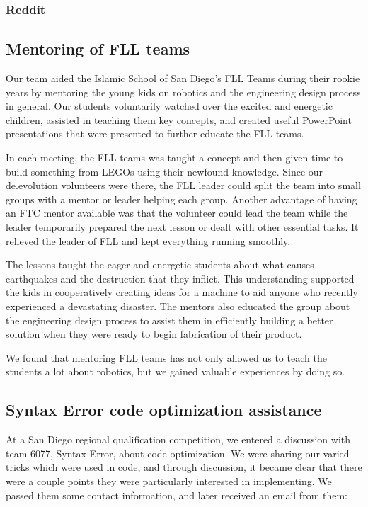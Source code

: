 \subsubsection{Reddit}

\subsection{Mentoring of FLL teams}
Our team aided the Islamic School of San Diego's FLL Teams during their rookie years by mentoring the young kids on robotics and the engineering design process in general. Our students voluntarily watched over the excited and energetic children, assisted in teaching them key concepts, and created useful PowerPoint presentations that were presented to further educate the FLL teams.

In each meeting, the FLL teams was taught a concept and then given time to build something from LEGOs using their newfound knowledge. Since our de.evolution volunteers were there, the FLL leader could split the team into small groups with a mentor or leader helping each group. Another advantage of having an FTC mentor available was that the volunteer could lead the team while the leader temporarily prepared the next lesson or dealt with other essential tasks. It relieved the leader of FLL and kept everything running smoothly.

The lessons taught the eager and energetic students about what causes earthquakes and the destruction that they inflict. This understanding supported the kids in cooperatively creating ideas for a machine to aid anyone who recently experienced a devastating disaster. The mentors also educated the group about the engineering design process to assist them in efficiently building a better solution when they were ready to begin fabrication of their product.

We found that mentoring FLL teams has not only allowed us to teach the students a lot about robotics, but we gained valuable experiences by doing so.


\subsection{Syntax Error code optimization assistance}

At a San Diego regional qualification competition, we entered a discussion with team 6077, Syntax Error, about code optimization. We were sharing our varied tricks which were used in code, and through discussion, it became clear that there were a couple points they were particularly interested in implementing. We passed them some contact information, and later received an email from them:

